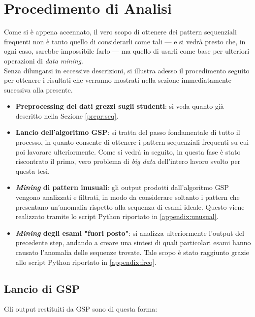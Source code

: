 \section{Procedimento di Analisi}

    Come si è appena accennato, il vero scopo di ottenere dei pattern sequenziali frequenti non è tanto quello di considerarli come tali --- e si vedrà presto che, in ogni caso, sarebbe impossibile farlo --- ma quello di usarli come base per ulteriori operazioni di \textit{data mining}. \\

    Senza dilungarsi in eccessive descrizioni, si illustra adesso il procedimento seguito per ottenere i risultati che verranno mostrati nella sezione immediatamente sucessiva alla presente.

    \begin{itemize}
        \item \textbf{Preprocessing dei dati grezzi sugli studenti}: si veda quanto già descritto nella Sezione \ref{prepr:seq}.
        \item \textbf{Lancio dell'algoritmo GSP}: si tratta del passo fondamentale di tutto il processo, in quanto consente di ottenere i pattern sequenziali frequenti su cui poi lavorare ulteriormente. Come si vedrà in seguito, in questa fase è stato riscontrato il primo, vero problema di \textit{big data} dell'intero lavoro svolto per questa tesi.
        \item \textbf{\textit{Mining} di pattern inusuali}: gli output prodotti dall'algoritmo GSP vengono analizzati e filtrati, in modo da considerare soltanto i pattern che presentano un'anomalia rispetto alla sequenza di esami ideale. Questo viene realizzato tramite lo script Python riportato in \ref{appendix:unusual}.
        \item \textbf{\textit{Mining} degli esami "fuori posto"}: si analizza ulteriormente l'output del precedente step, andando a creare una sintesi di quali particolari esami hanno causato l'anomalia delle sequenze trovate. Tale scopo è stato raggiunto grazie allo script Python riportato in \ref{appendix:freq}.
    \end{itemize}

    \subsection{Lancio di GSP}

        Gli output restituiti da GSP sono di questa forma: \\

